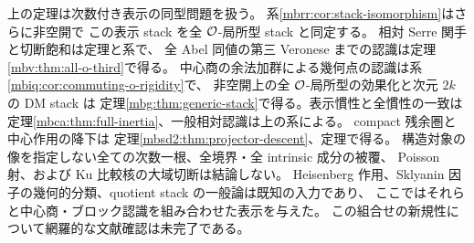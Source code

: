 \begin{remark}[この表示スタックと内在的モジュライの間]
\label{mbs:rem:intrinsic-boundary}
上の定理は次数付き表示の同型問題を扱う。
系\ref{mbrr:cor:stack-isomorphism}はさらに非空開で
この表示 stack を全 $\mathcal O$-局所型 stack と同定する。
相対 Serre 関手と切断飽和は定理と系で、
全 Abel 同値の第三 Veronese までの認識は定理\ref{mbv:thm:all-o-third}で得る。
中心商の余法加群による幾何点の認識は系\ref{mbiq:cor:commuting-o-rigidity}で、
非空開上の全 $\mathcal O$-局所型の効果化と次元 $2k$ の DM stack は
定理\ref{mbg:thm:generic-stack}で得る。表示慣性と全慣性の一致は
定理\ref{mbca:thm:full-inertia}、一般相対認識は上の系による。
compact 残余圏と中心作用の降下は
定理\ref{mbsd2:thm:projector-descent}、定理で得る。
構造対象の像を指定しない全ての次数一根、全境界・全 intrinsic 成分の被覆、
Poisson 射、および Ku 比較核の大域切断は結論しない。
Heisenberg 作用、Sklyanin 因子の幾何的分類、quotient stack の一般論は既知の入力であり、
ここではそれらと中心商・ブロック認識を組み合わせた表示を与えた。
この組合せの新規性について網羅的な文献確認は未完了である。
\end{remark}
